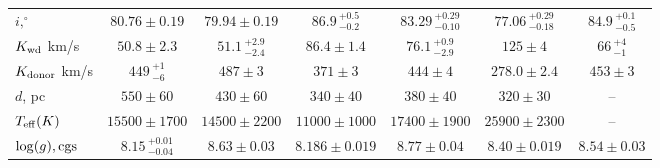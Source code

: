 \begin{landscape}
\begin{table*}
\begin{tabular}{lcccccc}
            $i, ^\circ$                 & $80.76\pm0.19$                    & $79.94\pm0.19$                & $86.9\,^{+0.5}_{-0.2}$        & $83.29\,^{+0.29}_{-0.10}$     & $77.06\,^{+0.29}_{-0.18}$         & $84.9\,^{+0.1}_{-0.5}$            \\
            $K_{\rm wd}$ km/s           & $50.8\pm2.3$                      & $51.1\,^{+2.9}_{-2.4}$        & $86.4\pm1.4$                  & $76.1\,^{+0.9}_{-2.9}$        & $125\pm4$                         & $66\,^{+4}_{-1}$                  \\
            $K_{\rm donor}$ km/s        & $449\,^{+1}_{-6}$                 & $487\pm3$                     & $371\pm3$                     & $444\pm4$                     & $278.0\pm2.4$                     & $453\pm3$                         \\
            \hline
            $d$, pc                     & $550\pm60$                        & $430\pm60$                & $340\pm40$                        & $380\pm40$                    & $320\pm30$                        & --                                \\
            $T_{\rm eff} (K)$           & $15500\pm1700$                    & $14500\pm2200$            & $11000\pm1000$                    & $17400\pm1900$                & $25900\pm2300$                    & --                                \\
            $\log(g), {\rm cgs}$        & $8.15\,^{+0.01}_{-0.04}$          & $8.63\pm0.03$             & $8.186\pm0.019$                   & $8.77\pm0.04$                 & $8.40\pm0.019$                    & $8.54\pm0.03$                     \\
            \hline \hline
        \end{tabular}
    \end{table*}


\end{landscape}
